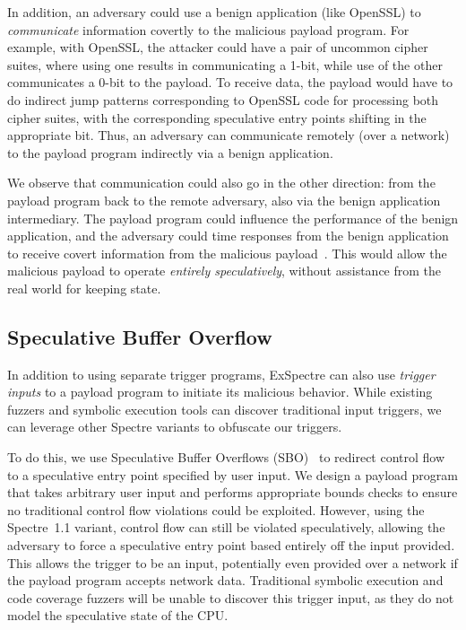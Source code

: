 \medskip

In addition, an adversary could use a benign application (like OpenSSL) to
\emph{communicate} information covertly to the malicious payload program. For
example, with OpenSSL, the attacker could have a pair of uncommon cipher suites,
where using one results in communicating a 1-bit, while use of the other
communicates a 0-bit to the payload. To receive data, the payload would have to
do indirect jump patterns corresponding to OpenSSL code for processing both
cipher suites, with the corresponding speculative entry points shifting in the
appropriate bit. Thus, an adversary can communicate remotely (over a network) to
the payload program indirectly via a benign application.

We observe that communication could also go in the other direction: from the
payload program back to the remote adversary, also via the benign application
intermediary. The payload program could influence the performance of the benign
application, and the adversary could time responses from the benign application
to receive covert information from the malicious
payload~\cite{schwarz2018netspectre}. This would allow the malicious payload to
operate \emph{entirely speculatively}, without assistance from the real world
for keeping state.





\subsection{Speculative Buffer Overflow}
\label{subsec:spec-buffer-overflow}

In addition to using separate trigger programs, ExSpectre can also use
\emph{trigger inputs} to a payload program to initiate its malicious behavior.
While existing fuzzers and symbolic execution tools can discover traditional
input triggers, we can leverage other Spectre variants to obfuscate our
triggers.

To do this, we use Speculative Buffer Overflows
(SBO)~\cite{kiriansky2018speculative} to redirect control flow to a speculative
entry point specified by user input. We design a payload program that takes
arbitrary user input and performs appropriate bounds checks to ensure no
traditional control flow violations could be exploited. However, using the
Spectre~1.1 variant, control flow can still be violated speculatively, allowing
the adversary to force a speculative entry point based entirely off the input
provided. This allows the trigger to be an input, potentially even provided over
a network if the payload program accepts network data. Traditional symbolic
execution and code coverage fuzzers will be unable to discover this trigger
input, as they do not model the speculative state of the CPU.

